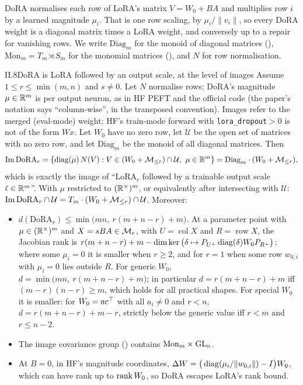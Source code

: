 DoRA normalises each row of LoRA's matrix $V=W_0+BA$ and multiplies row $i$ by a learned magnitude $\mu_i$. That is one
row scaling, by $\mu_i/\lVert v_i\rVert$, so every DoRA weight is a diagonal matrix times a LoRA weight, and conversely
up to a repair for vanishing rows. We write $\mathrm{Diag}_m$ for the monoid of diagonal matrices (),
$\mathrm{Mon}_m=T_m\rtimes S_m$ for the monomial matrices (), and $N$ for row normalisation.

\begin{proposition}{II.8}{DoRA is LoRA followed by an output scale, at the level of images}
Assume $1\le r\le\min(m,n)$ and $s\ne0$. Let $N$ normalise rows; DoRA's magnitude $\mu\in\mathbb{R}^m$ is per output neuron, as
in HF PEFT and the official code (the paper's notation says ``column-wise'', in the transposed convention). Images refer
to the merged (eval-mode) weight; HF's train-mode forward with \texttt{lora\_dropout}${}>0$ is not of the form $Wx$. Let
$W_0$ have no zero row, let $\mathcal U$ be the open set of matrices with no zero row, and let $\mathrm{Diag}_m$ be the
monoid of all diagonal matrices. Then
\begin{equation*}
  \operatorname{Im}\mathrm{DoRA}_r=\{\operatorname{diag}(\mu)\,N(V):V\in(W_0+\mathcal{M}_{\le r})\cap\mathcal U,\ \mu\in\mathbb{R}^m\}=\mathrm{Diag}_m\cdot(W_0+\mathcal{M}_{\le r}),
\end{equation*}
which is exactly the image of ``$\mathrm{LoRA}_r$ followed by a trainable output scale $\ell\in\mathbb{R}^m$''. With $\mu$
restricted to $(\mathbb{R}^\times)^m$, or equivalently after intersecting with $\mathcal U$:
$\operatorname{Im}\mathrm{DoRA}_r\cap\mathcal U=T_m\cdot(W_0+\mathcal{M}_{\le r})\cap\mathcal U$. Moreover:
\begin{itemize}
  \item $d(\mathrm{DoRA}_r)\le\min\big(mn,\ r(m+n-r)+m\big)$. At a parameter point with $\mu\in(\mathbb{R}^\times)^m$ and
    $X=sBA\in\mathcal{M}_r$, with $U=\operatorname{col}X$ and $R=\operatorname{row}X$, the Jacobian rank is
    $r(m+n-r)+m-\dim\ker\big(\delta\mapsto P_{U^\perp}\operatorname{diag}(\delta)W_0P_{R^\perp}\big)$; where some $\mu_i=0$ it is
    smaller when $r\ge2$, and for $r=1$ when some row $w_{0,i}$ with $\mu_i=0$ lies outside $R$. For generic $W_0$, $d=\min\big(mn,\ r(m+n-r)+m\big)$; in particular $d=r(m+n-r)+m$ iff
    $(m-r)(n-r)\ge m$, which holds for all practical shapes. For special $W_0$ it is smaller: for $W_0=ac^{\top}$ with all
    $a_i\ne0$ and $r<n$, $d=r(m+n-r)+m-r$, strictly below the generic value iff $r<m$ and $r\le n-2$.
  \item The image covariance group () contains $\mathrm{Mon}_m\times\mathrm{GL}_n$.
  \item At $B=0$, in HF's magnitude coordinates, $\Delta W=\big(\operatorname{diag}(\mu_i/\lVert w_{0,i}\rVert)-I\big)W_0$, which can
    have rank up to $\operatorname{rank} W_0$, so DoRA escapes LoRA's rank bound.
\end{itemize}
\end{proposition}

